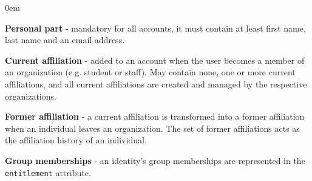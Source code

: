 \begin{description}
	\itemsep0em
	\item\textbf{Personal part} - mandatory for all accounts, it must contain at least first name, last name and an email address.
	\item\textbf{Current affiliation} - added to an account when the user becomes a member of an organization (e.g. student or staff). May contain none, one or more current affiliations, and all current affiliations are created and managed by the respective organizations.
	\item\textbf{Former affiliation} - a current affiliation is transformed into a former affiliation when an individual leaves an organization. The set of former affiliations acts as the affiliation history of an individual.
	\item\textbf{Group memberships} - an identity's group memberships are represented in the \texttt{entitlement} attribute.
\end{description}

